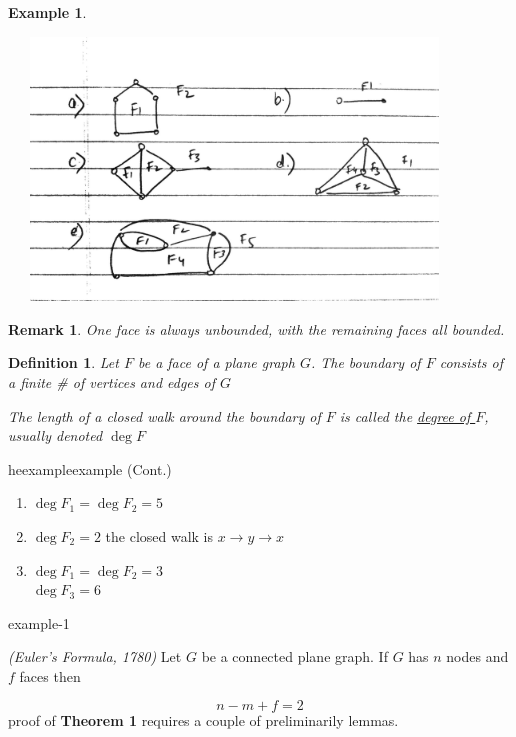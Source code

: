 \documentclass[12pt]{article}
\makeatletter
\newenvironment{theorem}[1]{%
  \renewcommand\themanualtheoreminner{#1}%
  \manualtheoreminner
}{\endmanualtheoreminner}
\newtheorem{example}{Example}
\newtheorem{definition}{Definition}
\newtheorem*{remark}{Remark}
\newenvironment{usecounterof}[2]{%
  \def\@tempb{#1}%
  \expandafter\renewcommand\csname the#1\endcsname{\ref{#2}}\@nameuse\@tempb}{%
    \@nameuse{end\@tempb}\addtocounter\@tempb{-1}}
\makeatother
\begin{document}
\begin{example}\label{a-thm}


  \begin{center}
  \includegraphics[width=12cm, height=7cm]{example2}
  \end{center}


\end{example}

\begin{remark}
  One face is always unbounded, with the remaining faces all bounded.
\end{remark}


\begin{definition}
  Let $F$ be a face of a plane graph $G$. The boundary of $F$ consists of a finite \# of vertices and edges of $G$

  The length of a closed walk around the boundary of $F$ is called the \underline{degree of $F$}, usually denoted $\deg F$

\end{definition}

\begin{usecounterof}{example}{a-thm} (Cont.)
\begin{enumerate}
  \item $\deg F_{1} = \deg F_{2} = 5$
  \item $\deg F_{2} = 2$ the closed walk is $x\to y \to x$
  \item $\deg F_{1} = \deg F_{2} = 3$\\
        $\deg F_{3} = 6$

\end{enumerate}


\end{usecounterof}


\begin{theorem}{1}
  \textit{(Euler's Formula, 1780)} Let $G$ be a connected plane graph. If $G$ has $n$ nodes and $f$ faces then

  \[n - m + f = 2\]
  proof of \textbf{Theorem 1} requires a couple of preliminarily lemmas.
\end{theorem}
\end{document}
